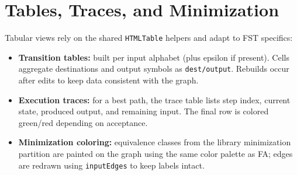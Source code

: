 \section{Tables, Traces, and Minimization}
\label{sec:oflat_tables}
Tabular views rely on the shared \texttt{HTMLTable} helpers and adapt to FST specifics:
\begin{itemize}
  \item \textbf{Transition tables:} built per input alphabet (plus epsilon if present). Cells aggregate destinations and
	  output symbols as \texttt{dest/output}. Rebuilds occur after edits to keep data consistent with the graph.
  \item \textbf{Execution traces:} for a best path, the trace table lists step index, current state, produced output, and
	  remaining input. The final row is colored green/red depending on acceptance.
	\item \textbf{Minimization coloring:} equivalence classes from the library minimization partition are painted on the
	  graph using the same color palette as FA; edges are redrawn using \texttt{inputEdges} to keep labels intact.
\end{itemize}

